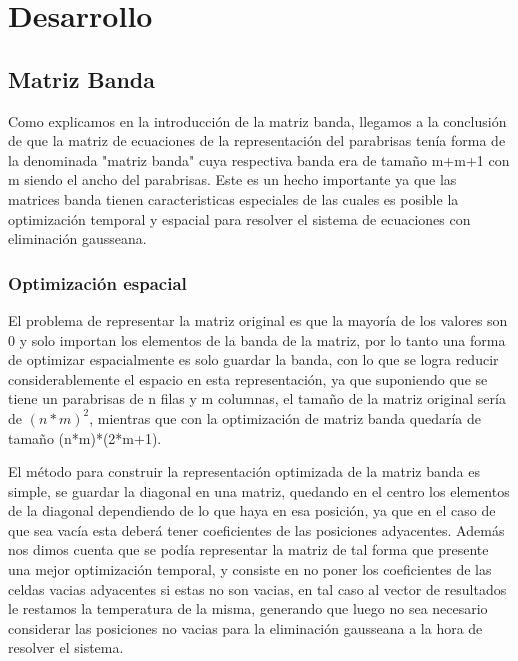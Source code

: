 \section{Desarrollo}

\subsection{Matriz Banda}

Como explicamos en la introducción de la matriz banda, llegamos a la conclusión de que la matriz de ecuaciones de la representación del parabrisas tenía forma de la denominada "matriz banda" cuya respectiva banda era de tamaño m+m+1 con m siendo el ancho del parabrisas. Este es un hecho importante ya que las matrices banda tienen caracteristicas especiales de las cuales es posible la optimización temporal y espacial para resolver el sistema de ecuaciones con eliminación gausseana.

\subsubsection{Optimización espacial}

El problema de representar la matriz original es que la mayoría de los valores son 0 y solo importan los elementos de la banda de la matriz, por lo tanto una forma de optimizar espacialmente es solo guardar la banda, con lo que se logra reducir considerablemente el espacio en esta representación, ya que suponiendo que se tiene un parabrisas de n filas y m columnas, el tamaño de la matriz original sería de $(n*m)^2$, mientras que con la optimización de matriz banda quedaría de tamaño (n*m)*(2*m+1).

El método para construir la representación optimizada de la matriz banda es simple, se guardar la diagonal en una matriz, quedando en el centro los elementos de la diagonal dependiendo de lo que haya en esa posición, ya que en el caso de que sea vacía esta deberá tener coeficientes de las posiciones adyacentes. Además nos dimos cuenta que se podía representar la matriz de tal forma que presente una mejor optimización temporal, y consiste en no poner los coeficientes de las celdas vacias adyacentes si estas no son vacias, en tal caso al vector de resultados le restamos la temperatura de la misma, generando que luego no sea necesario considerar las posiciones no vacias para la eliminación gausseana a la hora de resolver el sistema.

